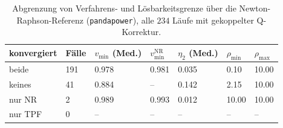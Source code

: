 \begin{table}[htbp]
\centering
\caption{Abgrenzung von Verfahrens- und L\"osbarkeitsgrenze \"uber die Newton-Raphson-Referenz (\texttt{pandapower}), alle $234$ L\"aufe mit gekoppelter Q-Korrektur.}
\label{tab:rx-nr}
\begin{tabular}{lllllll}
\toprule
konvergiert & F\"alle & $v_{\min}$ (Med.) & $v_{\min}^{\mathrm{NR}}$ & $\eta_2$ (Med.) & $\rho_{\min}$ & $\rho_{\max}$ \\
\midrule
beide & 191 & 0.978 & 0.981 & 0.035 & 0.10 & 10.00 \\
keines & 41 & 0.884 & {--} & 0.142 & 2.15 & 10.00 \\
nur NR & 2 & 0.989 & 0.993 & 0.012 & 10.00 & 10.00 \\
nur TPF & 0 & {--} & {--} & {--} & {--} & {--} \\
\bottomrule
\end{tabular}
\end{table}
